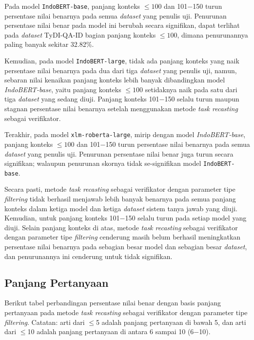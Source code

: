 Pada model \texttt{IndoBERT-base}, panjang konteks $\leq100$ dan 101$-$150 turun persentase nilai benarnya pada semua \emph{dataset} yang penulis uji. Penurunan persentase nilai benar pada model ini berubah secara signifikan, dapat terlihat pada \emph{dataset} TyDI-QA-ID bagian panjang konteks $\leq100$, dimana penurunannya paling banyak sekitar 32.82\%.

Kemudian, pada model \texttt{IndoBERT-large}, tidak ada panjang konteks yang naik persentase nilai benarnya pada dua dari tiga \emph{dataset} yang penulis uji, namun, sebaran nilai kenaikan panjang konteks lebih banyak dibandingkan model \emph{IndoBERT-base}, yaitu panjang konteks  $\leq100$ setidaknya naik pada satu dari tiga \emph{dataset} yang sedang diuji. Panjang konteks  101$-$150 selalu turun maupun stagnan persentase nilai benarnya setelah menggunakan metode \emph{task recasting} sebagai verifikator.

Terakhir, pada model \texttt{xlm-roberta-large}, mirip dengan model \emph{IndoBERT-base}, panjang konteks $\leq100$ dan 101$-$150 turun persentase nilai benarnya pada semua \emph{dataset} yang penulis uji. Penurunan persentase nilai benar juga turun secara signifikan; walaupun penurunan skornya tidak se-signifikan model \texttt{IndoBERT-base}.

Secara pasti, metode \emph{task recasting} sebagai verifikator dengan parameter tipe \emph{filtering} tidak berhasil menjawab lebih banyak benarnya pada semua panjang konteks dalam ketiga model dan ketiga \emph{dataset} sistem tanya jawab yang diuji. Kemudian, untuk panjang konteks 101$-$150 selalu turun pada setiap model yang diuji. Selain panjang konteks di atas, metode \emph{task recasting} sebagai verifikator dengan parameter tipe \emph{filtering} cenderung masih belum berhasil meningkatkan persentase nilai benarnya pada sebagian besar model dan sebagian besar \emph{dataset}, dan penurunannya ini cenderung untuk tidak signifikan.

\subsection{Panjang Pertanyaan}
Berikut tabel perbandingan persentase nilai benar dengan basis panjang pertanyaan pada metode \emph{task recasting} sebagai verifikator dengan parameter tipe \emph{filtering}. Catatan: arti dari $\leq$5 adalah panjang pertanyaan di bawah 5, dan arti dari $\leq$10 adalah panjang pertanyaan di antara 6 sampai 10 (6$-$10).

